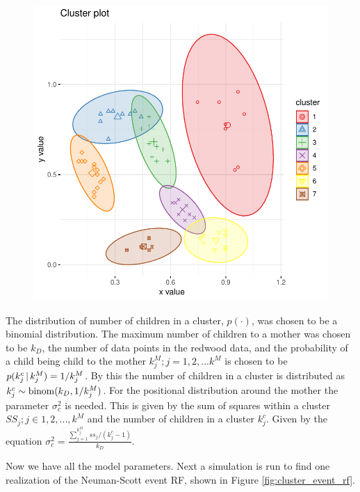 \begin{figure}
    \centering
    \includegraphics[scale=0.95]{figures/redwood_cluster_partitioning.pdf}
    \caption{}
    \label{fig:cluster_part}
\end{figure}

The distribution of number of children in a cluster, $p(\cdot)$, was chosen to be a binomial distribution. The maximum number of children to a mother was chosen to be $k_D$, the number of data points in the redwood data, and the probability of a child being child to the mother $k_j^M;j=1,2,...k^M$ is chosen to be $p(k_j^c \, | \, k_j^M) = 1/k_j^M$. By this the number of children in a cluster is distributed as $k_j^c \sim \mathrm{binom}(k_D,1/k_j^M)$. For the positional distribution around the mother the parameter $\sigma_c^2$ is needed. This is given by the sum of squares within a cluster $SS_j; j\in 1,2,...,k^M$ and the number of children in a cluster $k_j^c$. Given by the equation $\sigma_c^2 = \frac{\sum\limits_{j = 1}^{k_j^M}ss_j/(k_j^c-1)}{k_D}$.

Now we have all the model parameters. Next a simulation is run to find one realization of the Neuman-Scott event RF, shown in Figure \ref{fig:cluster_event_rf}.

